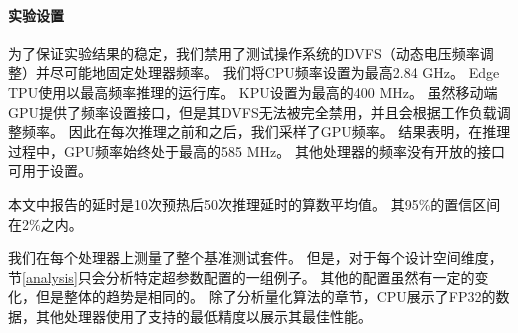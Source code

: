 \paragraph{实验设置}
为了保证实验结果的稳定，我们禁用了测试操作系统的DVFS（动态电压频率调整）并尽可能地固定处理器频率。
我们将CPU频率设置为最高2.84 GHz。
Edge TPU使用以最高频率推理的运行库。
KPU设置为最高的400 MHz。
虽然移动端GPU提供了频率设置接口，但是其DVFS无法被完全禁用，并且会根据工作负载调整频率。
因此在每次推理之前和之后，我们采样了GPU频率。
结果表明，在推理过程中，GPU频率始终处于最高的585 MHz。
其他处理器的频率没有开放的接口可用于设置。

本文中报告的延时是10次预热后50次推理延时的算数平均值。
其95\%的置信区间在2\%之内。

我们在每个处理器上测量了整个基准测试套件。
但是，对于每个设计空间维度，节\ref{analysis}只会分析特定超参数配置的一组例子。
其他的配置虽然有一定的变化，但是整体的趋势是相同的。
除了分析量化算法的章节，CPU展示了FP32的数据，其他处理器使用了支持的最低精度以展示其最佳性能。
